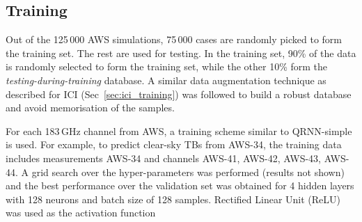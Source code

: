 \documentclass[amt, manuscript]{copernicus}
\begin{document}
\subsection{Training}
%
Out of the 125\,000 AWS simulations, 75\,000 cases are randomly picked to form the training set. The rest are used for testing. In the training set, 90\% of the data is randomly selected to form the training set, while the other 10\% form the \textit{testing-during-training} database. A similar data augmentation technique as described for ICI (Sec~\ref{sec:ici_training}) was followed to build a robust database and avoid memorisation of the samples. 

For each 183\,GHz channel from AWS, a training scheme similar to QRNN-simple is used. For example, to
predict clear-sky TBs from AWS-34, the training data includes measurements AWS-34 and channels AWS-41, AWS-42, AWS-43, AWS-44. A grid search over the hyper-parameters was performed (results not shown) and the best performance over the validation set was obtained for 4 hidden layers with 128 neurons and batch size of 128 samples. Rectified Linear Unit (ReLU) was used as the activation function
\end{document}
